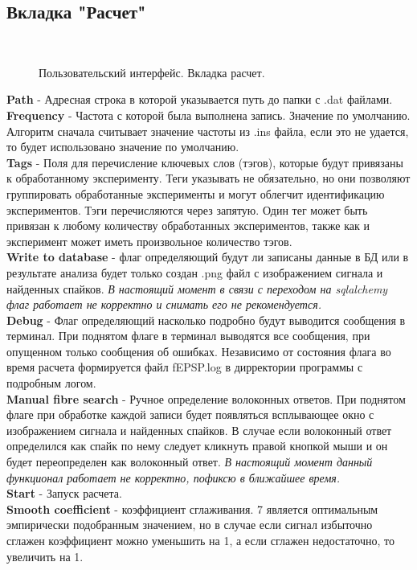 \documentclass[12pt,a4paper]{report}
\begin{document}
\subsection{Вкладка "Расчет"}
\begin{figure}[h!]
\vspace{-5pt}
	\\
 \caption{Пользовательский интерфейс. Вкладка расчет.}
\label{fig:analyse}
\end{figure}

\textbf{Path} - Адресная строка в которой указывается путь до папки с .dat файлами.\\
\textbf{Frequency} - Частота с которой была выполнена запись. Значение по умолчанию. Алгоритм сначала считывает значение частоты из .ins файла, если это не удается, то будет использовано значение по умолчанию.\\
\textbf{Tags} - Поля для перечисление ключевых слов (тэгов), которые будут привязаны к обработанному эксперименту. Теги указывать не обязательно, но они позволяют группировать обработанные эксперименты и могут облегчит идентификацию экспериментов. Тэги перечисляются через запятую. Один тег может быть привязан к любому количеству обработанных экспериментов, также как и эксперимент может иметь произвольное количество тэгов.\\
\textbf{Write to database} - флаг определяющий будут ли записаны данные в БД или в результате анализа будет только создан .png файл с изображением сигнала и найденных спайков. \textit{В настоящий момент в связи с переходом на sqlalchemy флаг работает не корректно и снимать его не рекомендуется.}\\
\textbf{Debug} - Флаг определяющий насколько подробно будут выводится сообщения в терминал. При поднятом флаге в терминал выводятся все сообщения, при опущенном только сообщения об ошибках. Независимо от состояния флага во время расчета формируется файл fEPSP.log в дирректории программы с подробным логом.\\
\textbf{Manual fibre search} - Ручное определение волоконных ответов. При поднятом флаге при обработке каждой записи будет появляться всплывающее окно с изображением сигнала и найденных спайков. В случае если волоконный ответ определился как спайк по нему следует кликнуть правой кнопкой мыши и он будет переопределен как волоконный ответ. \textit{В настоящий момент данный функционал работает не корректно, пофиксю в ближайшее время.}\\
\textbf{Start} - Запуск расчета.\\
\textbf{Smooth coefficient} - коэффициент сглаживания. 7 является оптимальным эмпирически подобранным значением, но в случае если сигнал избыточно сглажен коэффициент можно уменьшить на 1, а если сглажен недостаточно, то увеличить на 1.\\
\end{document}
